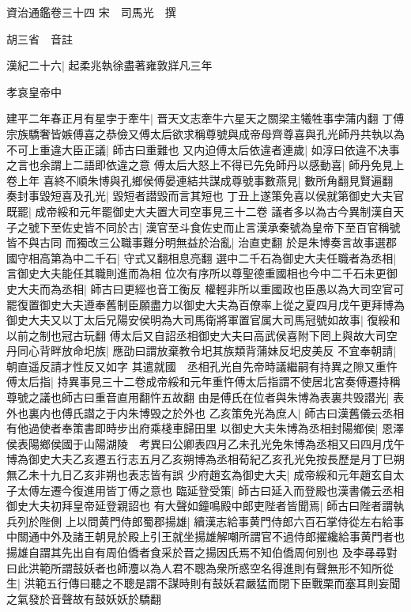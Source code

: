 資治通鑑卷三十四
宋　司馬光　撰

胡三省　音註

漢紀二十六|{
	起柔兆執徐盡著雍敦牂凡三年}


孝哀皇帝中

建平二年春正月有星孛于牽牛|{
	晋天文志牽牛六星天之關梁主犧牲事孛蒲内翻}
丁傅宗族驕奢皆嫉傅喜之恭儉又傅太后欲求稱尊號與成帝母齊尊喜與孔光師丹共執以為不可上重違大臣正議|{
	師古曰重難也}
又内迫傅太后依違者連歲|{
	如淳曰依違不决事之言也余謂上二語即依違之意}
傅太后大怒上不得已先免師丹以感動喜|{
	師丹免見上卷上年}
喜終不順朱博與孔鄉侯傅晏連結共謀成尊號事數燕見|{
	數所角翻見賢遍翻}
奏封事毀短喜及孔光|{
	毀短者譛毀而言其短也}
丁丑上遂策免喜以侯就第御史大夫官既罷|{
	成帝綏和元年罷御史大夫置大司空事見三十二卷}
議者多以為古今異制漢自天子之號下至佐史皆不同於古|{
	漢官至斗食佐史而止言漢承秦號為皇帝下至百官稱號皆不與古同}
而獨改三公職事難分明無益於治亂|{
	治直吏翻}
於是朱博奏言故事選郡國守相高第為中二千石|{
	守式又翻相息亮翻}
選中二千石為御史大夫任職者為丞相|{
	言御史大夫能任其職則進而為相}
位次有序所以尊聖德重國相也今中二千石未更御史大夫而為丞相|{
	師古曰更經也音工衡反}
權輕非所以重國政也臣愚以為大司空官可罷復置御史大夫遵奉舊制臣願盡力以御史大夫為百僚率上從之夏四月戊午更拜博為御史大夫又以丁太后兄陽安侯明為大司馬衛將軍置官属大司馬冠號如故事|{
	復綏和以前之制也冠古玩翻}
傅太后又自詔丞相御史大夫曰高武侯喜附下罔上與故大司空丹同心背畔放命圯族|{
	應劭曰謂放棄教令圯其族類背蒲妹反圯皮美反}
不宜奉朝請|{
	朝直遥反請才性反又如字}
其遣就國　丞相孔光自先帝時議繼嗣有持異之隙又重忤傅太后指|{
	持異事見三十二卷成帝綏和元年重忤傅太后指謂不使居北宮奏傅遷持稱尊號之議也師古曰重音直用翻忤五故翻}
由是傅氏在位者與朱博為表裏共毁譛光|{
	表外也裏内也傅氏譛之于内朱博毁之於外也}
乙亥策免光為庶人|{
	師古曰漢舊儀云丞相有他過使者奉策書即時步出府乘棧車歸田里}
以御史大夫朱博為丞相封陽鄉侯|{
	恩澤侯表陽鄉侯國于山陽湖陵　考異曰公卿表四月乙未孔光免朱博為丞相又曰四月戊午博為御史大夫乙亥遷五行志五月乙亥朔博為丞相荀紀乙亥孔光免按長歷是月丁巳朔無乙未十九日乙亥非朔也表志皆有誤}
少府趙玄為御史大夫|{
	成帝綏和元年趙玄自太子太傅左遷今復進用皆丁傅之意也}
臨延登受策|{
	師古曰延入而登殿也漢書儀云丞相御史大夫初拜皇帝延登親詔也}
有大聲如鐘鳴殿中郎吏陛者皆聞焉|{
	師古曰陛者謂執兵列於陛側}
上以問黄門侍郎蜀郡揚雄|{
	續漢志給事黄門侍郎六百石掌侍從左右給事中關通中外及諸王朝見於殿上引王就坐揚雄解嘲所謂官不過侍郎擢纔給事黄門者也揚雄自謂其先出自有周伯僑者食采於晋之揚因氏焉不知伯僑周何别也}
及李㝷尋對曰此洪範所謂鼓妖者也師灋以為人君不聰為衆所惑空名得進則有聲無形不知所從生|{
	洪範五行傳曰聽之不聰是謂不謀時則有鼓妖君嚴猛而閉下臣戰栗而塞耳則妄聞之氣發於音聲故有鼓妖妖於驕翻}
